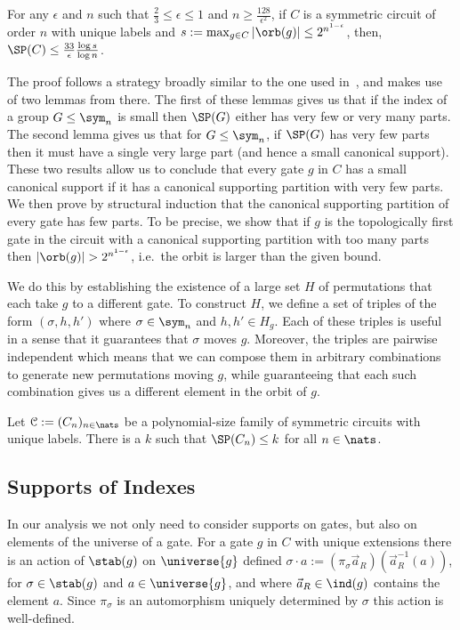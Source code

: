 \documentclass[a4paper,UKenglish]{lipics-v2018}
\begin{document}
\begin{theorem}
  \label{thm:support-thm}
  For any $\epsilon$ and $n$ such that $\frac{2}{3} \leq \epsilon \leq 1$ and $n
  \geq \frac{128}{\epsilon^2}$, if $C$ is a symmetric circuit of order $n$ with
  unique labels and $s := \max_{g \in C} \vert \orb (g)\vert \leq
  2^{n^{1-\epsilon}}$, then, $\SP(C) \leq \frac{33}{\epsilon}\frac{\log s}{\log
    n}$.
\end{theorem}

The proof follows a strategy broadly similar to the one used
in~\cite{AndersonD17}, and makes use of two lemmas from there. The first of
these lemmas gives us that if the index of a group $G \leq \sym_n$ is small then
$\SP(G)$ either has very few or very many parts. The second lemma gives us that
for $G \leq \sym_n$, if $\SP(G)$ has very few parts then it must have a single
very large part (and hence a small canonical support). These two results allow
us to conclude that every gate $g$ in $C$ has a small canonical support if it
has a canonical supporting partition with very few parts. We then prove by
structural induction that the canonical supporting partition of every gate has
few parts. To be precise, we show that if $g$ is the topologically first gate in
the circuit with a canonical supporting partition with too many parts then
$\vert \orb(g) \vert > 2^{n^{1 - \epsilon}}$, i.e.\ the orbit is larger than the
given bound.

We do this by establishing the existence of a large set $H$ of permutations that
each take $g$ to a different gate. To construct $H$, we define a set of triples
of the form $(\sigma, h, h')$ where $\sigma \in \sym_n$ and $h,h' \in H_g$. Each
of these triples is useful in a sense that it guarantees that $\sigma$ moves
$g$. Moreover, the triples are pairwise independent which means that we can
compose them in arbitrary combinations to generate new permutations moving $g$,
while guaranteeing that each such combination gives us a different element in
the orbit of $g$.

\begin{lemma}
  Let $\mathcal{C} := (C_n)_{n \in \nats}$ be a polynomial-size family of
  symmetric circuits with unique labels. There is a $k$ such that $\SP(C_n) \leq
  k$ for all $n \in \nats$.
  \label{lem:constant-size-support}
\end{lemma}

\subsection*{Supports of Indexes}
In our analysis we not only need to consider supports on gates, but also on
elements of the universe of a gate. For a gate $g$ in $C$ with unique extensions
there is an action of $\stab(g)$ on $\universe{g}$ defined $\sigma \cdot a :=
(\pi_{\sigma}\vec{a}_R) (\vec{a}^{-1}_R(a))$, for $\sigma \in \stab(g)$ and $a
\in \universe{g}$, and where $\vec{a}_R \in \ind(g)$ contains the element $a$.
Since $\pi_{\sigma}$ is an automorphism uniquely determined by $\sigma$ this
action is well-defined.
\end{document}
